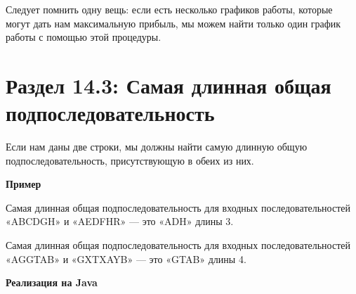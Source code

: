 \vspace{\baselineskip}
Следует помнить одну вещь: если есть несколько графиков работы, которые могут дать нам максимальную прибыль, мы можем найти только один график работы с помощью этой процедуры. 

\vspace{\baselineskip}
\section*{Раздел 14.3: Самая длинная общая подпоследовательность}

\vspace{\baselineskip}
Если нам даны две строки, мы должны найти самую длинную общую подпоследовательность, присутствующую в обеих из них. 

\vspace{\baselineskip}
\textbf{Пример}

\vspace{\baselineskip}
Самая длинная общая подпоследовательность для входных последовательностей «ABCDGH» и «AEDFHR» --- это «ADH» длины 3. 

\vspace{\baselineskip}
Самая длинная общая подпоследовательность для входных последовательностей «AGGTAB» и «GXTXAYB» --- это «GTAB» длины 4.

\vspace{\baselineskip}
\textbf{Реализация на Java}

